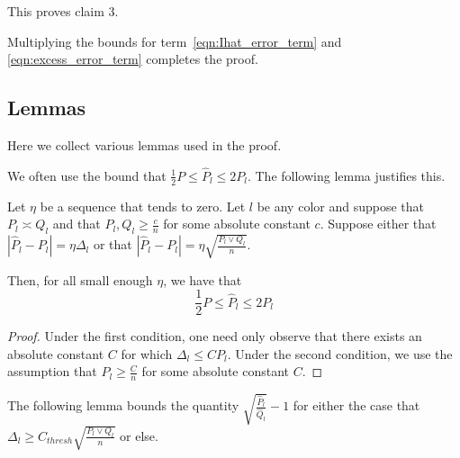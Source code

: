 \documentclass{article}
\begin{document}
This proves claim 3. 

Multiplying the bounds for term~\ref{eqn:Ihat_error_term} and \ref{eqn:excess_error_term} completes the proof. 



\subsection{Lemmas}

Here we collect various lemmas used in the proof.

We often use the bound that $\frac{1}{2} P \leq \hat{P}_l \leq 2 P_l$. The following lemma justifies this.

\begin{lemma}
\label{lem:bound_ratio_P_Pl}
Let $\eta$ be a sequence that tends to zero. Let $l$ be any color and suppose that $P_l \asymp Q_l$ and that $P_l, Q_l \geq \frac{c}{n}$ for some absolute constant $c$. Suppose either that $|\hat{P}_l - P_l| = \eta \Delta_l$ or that $| \hat{P}_l - P_l | = \eta \sqrt{ \frac{P_l \vee Q_l}{n} }$. 

Then, for all small enough $\eta$, we have that
\[
\frac{1}{2} P \leq \hat{P}_l \leq 2 P_l
\]

\end{lemma}

\begin{proof}
Under the first condition, one need only observe that there exists an absolute constant $C$ for which $\Delta_l \leq C P_l$. Under the second condition, we use the assumption that $P_l \geq \frac{C}{n}$ for some absolute constant $C$. 

\end{proof}

The following lemma bounds the quantity $\sqrt{ \frac{\hat{P}_l}{\hat{Q}_l}} - 1$ for either the case that $\Delta_l \geq C_{thresh} \sqrt{ \frac{P_l \vee Q_l}{n} }$ or else. 
\end{document}
